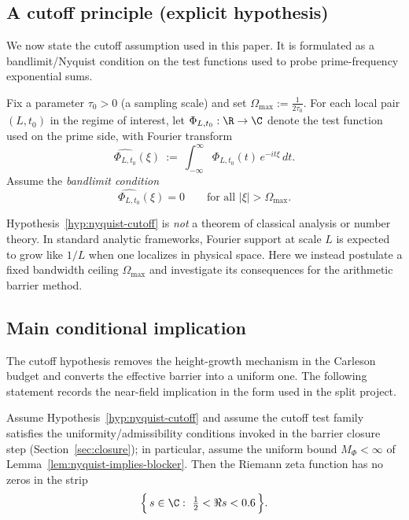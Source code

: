 \documentclass[11pt]{article}
\begin{document}
\subsection*{A cutoff principle (explicit hypothesis)}
We now state the cutoff assumption used in this paper.
It is formulated as a bandlimit/Nyquist condition on the test functions used to probe prime-frequency exponential sums.

\begin{hypothesis}\label{hyp:nyquist-cutoff}
Fix a parameter $\tau_0>0$ (a sampling scale) and set $\Omega_{\max}:=\frac{1}{2\tau_0}$.
For each local pair $(L,t_0)$ in the regime of interest, let $\Phi_{L,t_0}:\R\to\C$ denote the test function used on the prime side, with Fourier transform
\[
  \widehat{\Phi_{L,t_0}}(\xi)\ :=\ \int_{-\infty}^{\infty}\Phi_{L,t_0}(t)\,e^{-it\xi}\,dt.
\]
Assume the \emph{bandlimit condition}
\[
  \widehat{\Phi_{L,t_0}}(\xi)=0
  \qquad \text{for all }|\xi|>\Omega_{\max}.
\]
\end{hypothesis}

\begin{remark}\label{rem:hyp-status}
Hypothesis~\ref{hyp:nyquist-cutoff} is \emph{not} a theorem of classical analysis or number theory.
In standard analytic frameworks, Fourier support at scale $L$ is expected to grow like $1/L$ when one localizes in physical space.
Here we instead postulate a fixed bandwidth ceiling $\Omega_{\max}$ and investigate its consequences for the arithmetic barrier method.
\end{remark}

\subsection*{Main conditional implication}
The cutoff hypothesis removes the height-growth mechanism in the Carleson budget and converts the effective barrier into a uniform one.
The following statement records the near-field implication in the form used in the split project.

\begin{theorem}\label{thm:nyquist-nearfield}
Assume Hypothesis~\ref{hyp:nyquist-cutoff} and assume the cutoff test family satisfies the uniformity/admissibility conditions invoked in the barrier closure step (Section~\ref{sec:closure}); in particular, assume the uniform bound $M_\Phi<\infty$ of Lemma~\ref{lem:nyquist-implies-blocker}.
Then the Riemann zeta function has no zeros in the strip
\[
  \Bigl\{\,s\in\C:\ \tfrac12<\Re s<0.6\,\Bigr\}.
\]
\end{theorem}
\end{document}
